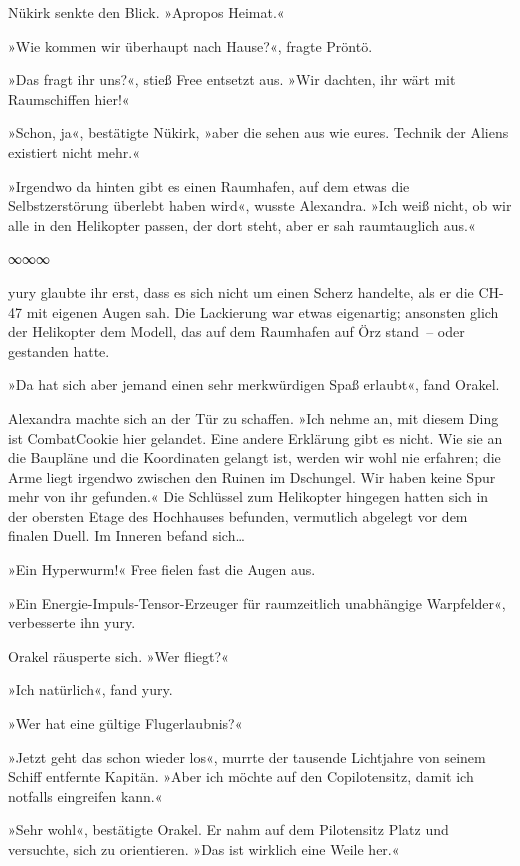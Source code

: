 Nükirk senkte den Blick. »Apropos Heimat.«

»Wie kommen wir überhaupt nach Hause?«, fragte Pröntö.

»Das fragt ihr uns?«, stieß Free entsetzt aus. »Wir dachten, ihr wärt mit Raumschiffen hier!«

»Schon, ja«, bestätigte Nükirk, »aber die sehen aus wie eures. Technik der Aliens existiert nicht mehr.«

»Irgendwo da hinten gibt es einen Raumhafen, auf dem etwas die Selbstzerstörung überlebt haben wird«, wusste Alexandra. »Ich weiß nicht, ob wir alle in den Helikopter passen, der dort steht, aber er sah raumtauglich aus.«

\begin{center}
∞∞∞
\end{center}

yury glaubte ihr erst, dass es sich nicht um einen Scherz handelte, als er die CH-47 mit eigenen Augen sah. Die Lackierung war etwas eigenartig; ansonsten glich der Helikopter dem Modell, das auf dem Raumhafen auf Örz stand~– oder gestanden hatte.

»Da hat sich aber jemand einen sehr merkwürdigen Spaß erlaubt«, fand Orakel.

Alexandra machte sich an der Tür zu schaffen. »Ich nehme an, mit diesem Ding ist CombatCookie hier gelandet. Eine andere Erklärung gibt es nicht. Wie sie an die Baupläne und die Koordinaten gelangt ist, werden wir wohl nie erfahren; die Arme liegt irgendwo zwischen den Ruinen im Dschungel. Wir haben keine Spur mehr von ihr gefunden.« Die Schlüssel zum Helikopter hingegen hatten sich in der obersten Etage des Hochhauses befunden, vermutlich abgelegt vor dem finalen Duell. Im Inneren befand sich…

»Ein Hyperwurm!« Free fielen fast die Augen aus.

»Ein Energie-Impuls-Tensor-Erzeuger für raumzeitlich unabhängige Warpfelder«, verbesserte ihn yury.

Orakel räusperte sich. »Wer fliegt?«

»Ich natürlich«, fand yury.

»Wer hat eine gültige Flugerlaubnis?«

»Jetzt geht das schon wieder los«, murrte der tausende Lichtjahre von seinem Schiff entfernte Kapitän. »Aber ich möchte auf den Copilotensitz, damit ich notfalls eingreifen kann.«

»Sehr wohl«, bestätigte Orakel. Er nahm auf dem Pilotensitz Platz und versuchte, sich zu orientieren. »Das ist wirklich eine Weile her.«

